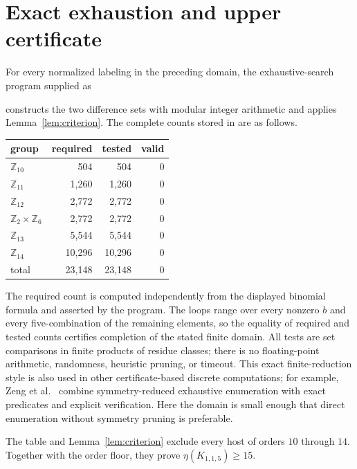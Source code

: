 \documentclass[11pt]{article}
\newcommand{\Z}{\mathbb Z}
\begin{document}
\section{Exact exhaustion and upper certificate}

For every normalized labeling in the preceding domain, the exhaustive-search
program supplied as
\begin{center}
\end{center}
constructs the two difference sets with modular integer arithmetic and applies
Lemma~\ref{lem:criterion}.  The complete counts stored in
 are as follows.

\begin{center}
\begin{tabular}{lrrr}
\toprule
group & required & tested & valid\\
\midrule
$\Z_{10}$             &   504 &   504 & 0\\
$\Z_{11}$             & 1,260 & 1,260 & 0\\
$\Z_{12}$             & 2,772 & 2,772 & 0\\
$\Z_2\times\Z_6$     & 2,772 & 2,772 & 0\\
$\Z_{13}$             & 5,544 & 5,544 & 0\\
$\Z_{14}$             &10,296 &10,296 & 0\\
\midrule
total                  &23,148 &23,148 & 0\\
\bottomrule
\end{tabular}
\end{center}

The required count is computed independently from the displayed binomial
formula and asserted by the program.  The loops range over every nonzero
$b$ and every five-combination of the remaining elements, so the equality
of required and tested counts certifies completion of the stated finite
domain.  All tests are set comparisons in finite products of residue
classes; there is no floating-point arithmetic, randomness, heuristic
pruning, or timeout.  This exact finite-reduction style is also used in
other certificate-based discrete computations; for example, Zeng et
al.~\cite{ZengLiuRatnaveluOng2026} combine symmetry-reduced exhaustive
enumeration with exact predicates and explicit verification.  Here the
domain is small enough that direct enumeration without symmetry pruning is
preferable.

The table and Lemma~\ref{lem:criterion} exclude every host of orders
$10$ through $14$.  Together with the order floor, they prove
$\eta(K_{1,1,5})\geq15$.
\end{document}
